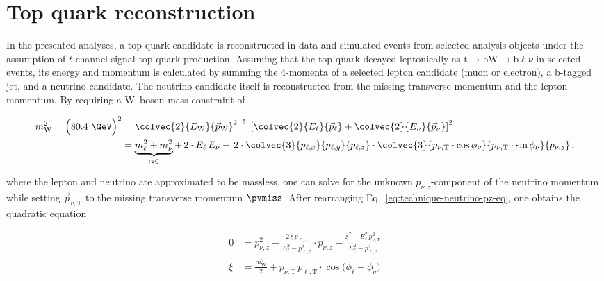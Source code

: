 \section{Top quark reconstruction}
\label{sec:technique-topreco}

In the presented analyses, a top quark candidate is reconstructed in data and simulated events from selected analysis objects under the assumption of $t$-channel signal top quark production. Assuming that the top quark decayed leptonically as $\mathrm{t}\to\mathrm{b}\mathrm{W}\to\mathrm{b}\ell\nu$ in selected events, its energy and momentum is calculated by summing the 4-momenta of a selected lepton candidate (muon or electron), a b-tagged jet, and a neutrino candidate. The neutrino candidate itself is reconstructed from the missing transverse momentum and the lepton momentum. By requiring a W~boson mass constraint of

\begin{align}
m_\mathrm{W}^2=\Big(80.4~\GeV\Big)^2&=\colvec{2}{E_\mathrm{W}}{\vec{p}_\mathrm{W}}^{2}\overset{!}{=}\left[\colvec{2}{E_{\ell}}{\vec{p}_{\ell}}+\colvec{2}{E_{\nu}}{\vec{p}_{\nu}}\right]^{2}\nonumber\\
&=\underbrace{m_{\ell}^2+m_{\nu}^2}_{\approx 0}+\,2\cdot E_{\ell}\,E_{\nu}-\,2\cdot\colvec{3}{p_{\ell,x}}{p_{\ell,y}}{p_{\ell,z}}\cdot\colvec{3}{p_{\nu,\mathrm{T}}\cdot\cos\phi_{\nu}}{p_{\nu,\mathrm{T}}\cdot\sin\phi_{\nu}}{p_{\nu,z}}\,, \label{eq:technique-neutrino-pz-eq}
\end{align}

where the lepton and neutrino are approximated to be massless, one can solve for the unknown $p_{\nu,z}$-component of the neutrino momentum while setting $\vec{p}_{v,\mathrm{T}}$ to the missing transverse momentum $\pvmiss$. After rearranging Eq.~\ref{eq:technique-neutrino-pz-eq}, one obtains the quadratic equation 

\begin{subequations}
\begin{align}
0&=p_{\nu,z}^2-\frac{2\,\xi\,p_{\ell,z}}{E_{\ell}^{2}-p_{\ell,z}^2}\cdot p_{\nu,z}-\frac{\xi^{2}-E_{\ell}^{2}\,p_{\nu,\mathrm{T}}^2}{E_{\ell}^{2}-p_{\ell,z}^2}\\
\xi&=\frac{m_\mathrm{W}^2}{2}+p_{\nu,\mathrm{T}}\,p_{\ell,\mathrm{T}}\cdot\cos\big(\phi_\ell-\phi_\nu\big)
\end{align}
\end{subequations}

